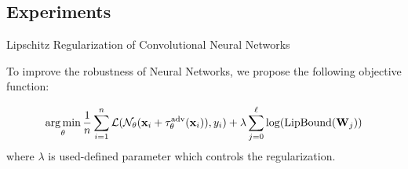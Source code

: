 \subsection{Experiments}



\begin{frame}{Lipschitz Regularization of Convolutional Neural Networks}

  To improve the robustness of Neural Networks, we propose the following objective function:

  \begin{equation*}
    \operatorname*{arg\,min}_{\theta} \frac{1}{n} \sum_{i=1}^{n} \mathcal{L} (\mathcal{N}_\theta (\mathbf{x}_i + \tau_{\theta}^{\mathrm{adv}}(\mathbf{x}_i)), y_i) + \lambda \sum_{j=0}^\ell \log(\operatorname*{LipBound}(\mathbf{W}_j)) 
  \end{equation*}
  where $\lambda$ is  used-defined parameter which controls the regularization.

\end{frame}




